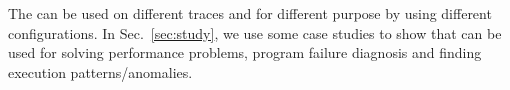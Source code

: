 


The \VDP{} can be used on different traces and for different purpose
by using different configurations.
In Sec.~\ref{sec:study}, we use some case studies to show that
\VDP{} can be used for solving performance problems,
program failure diagnosis and finding execution patterns/anomalies.

